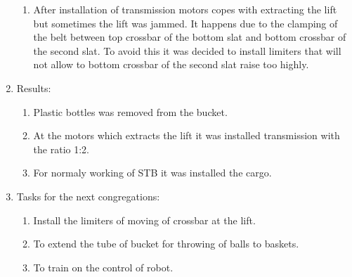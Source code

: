 \begin{enumerate}
\begin{enumerate}
      \item After installation of transmission motors copes with extracting the lift but sometimes the lift was jammed. It happens due to the  clamping of the belt between top crossbar of the bottom slat and bottom crossbar of the second slat. To avoid this it was decided to install limiters that will not allow to bottom crossbar of the second slat raise too highly.
          
    \end{enumerate}
    
	\item Results:
	\begin{enumerate}
	  \item Plastic bottles was removed from the bucket. 
	  
      \item At the motors which extracts the lift it was installed transmission with the ratio 1:2.
      
      \item For normaly working of STB it was installed the cargo.
    \end{enumerate}
    
	\item Tasks for the next congregations:
	\begin{enumerate}
	  \item Install the limiters of moving of crossbar at the lift.
	  
	  \item To extend the tube of bucket for throwing of balls to baskets.
	  
	  \item To train on the control of robot.

    \end{enumerate}     
\end{enumerate}
\fillpage